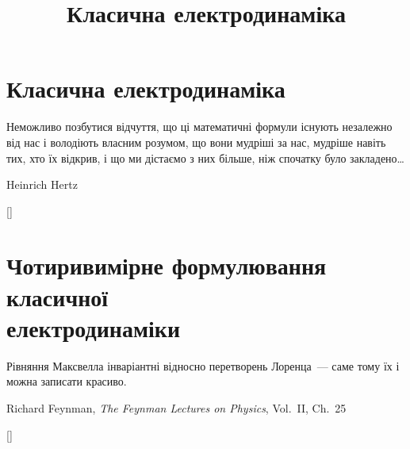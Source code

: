\documentclass[%
biblatex,
]{ConspectBook}
\title{Класична електродинаміка}
\begin{document}
\pagestyle{empty}
\CoverPage
{}
\maketitle
\makeinfopage
%
\clearpage\pagestyle{plain}
\tableofcontents%
%

%
%

%
%



\pagestyle{main}
\part{Класична електродинаміка}
\label{part:I}
\epigraph{Неможливо позбутися відчуття, що ці математичні формули існують незалежно від нас і володіють власним розумом, що вони мудріші за нас, мудріше навіть тих, хто їх відкрив, і що ми дістаємо з них більше, ніж спочатку було закладено\ldots}{Heinrich Hertz}
[]

\part{Чотиривимірне формулювання класичної\\ електродинаміки}
\label{part:II}
\epigraph{Рівняння Максвелла
	інваріантні відносно перетворень Лоренца~--- саме тому їх
	і можна записати красиво.}{Richard Feynman,
	\textit{The Feynman Lectures on Physics}, Vol.~II, Ch.~25}
[]
\end{document}
